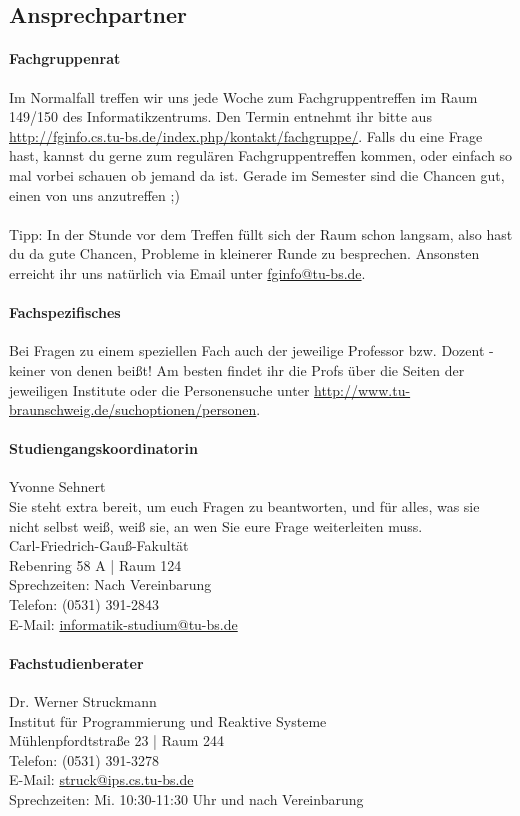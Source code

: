\begin{multicols}{2}
\subsection{Ansprechpartner}
	\paragraph{Fachgruppenrat}
		Im Normalfall treffen wir uns jede Woche zum
		Fachgruppentreffen im Raum 149/150 des
		Informatikzentrums. Den  Termin entnehmt ihr bitte aus
		\url{http://fginfo.cs.tu-bs.de/index.php/kontakt/fachgruppe/}.
		Falls du eine Frage hast, kannst du gerne zum regulären
		Fachgruppentreffen kommen, oder einfach so mal vorbei
		schauen ob jemand da ist. Gerade im Semester sind die
		Chancen gut, einen von uns anzutreffen ;) \\\\
		Tipp: In der Stunde vor dem
		Treffen füllt sich der Raum schon langsam, also hast du
		da gute Chancen, Probleme in kleinerer Runde zu
		besprechen.
		Ansonsten erreicht ihr uns natürlich via
		Email unter \url{fginfo@tu-bs.de}. 

	\paragraph{Fachspezifisches}
		Bei Fragen zu einem speziellen Fach auch der jeweilige Professor bzw. Dozent - keiner von denen beißt! Am besten findet ihr die Profs über die Seiten der jeweiligen Institute oder die Personensuche unter \url{http://www.tu-braunschweig.de/suchoptionen/personen}.

	\paragraph{Studiengangskoordinatorin}
		Yvonne Sehnert \\
		Sie steht extra bereit, um euch Fragen zu beantworten, und für alles, was sie nicht selbst weiß, weiß sie, an wen Sie eure Frage weiterleiten muss.\\
		Carl-Friedrich-Gauß-Fakultät\\
		Rebenring 58 A | Raum 124\\
		Sprechzeiten: Nach  Vereinbarung\\
		Telefon: (0531) 391-2843\\
		E-Mail: \url{informatik-studium@tu-bs.de}

	\paragraph{Fachstudienberater}
		Dr. Werner Struckmann\\
		Institut für Programmierung und Reaktive Systeme\\
		Mühlenpfordtstraße 23 | Raum 244\\
		Telefon: (0531) 391-3278\\
		E-Mail: \url{struck@ips.cs.tu-bs.de}\\
		Sprechzeiten: Mi. 10:30-11:30 Uhr und nach  Vereinbarung


\end{multicols}
